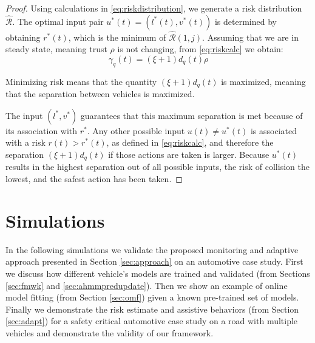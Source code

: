 \documentclass[letterpaper, 10 pt, conference]{ieeeconf}  %
\begin{document}
\begin{proof}
Using calculations in \eqref{eq:riskdistribution}, we generate a risk distribution $\hat{\mathcal{R}}$. The optimal input pair $u^*(t)=(l^*(t),v^*(t))$ is determined by obtaining $r^*(t)$, which is the minimum of $\hat{\mathcal{R}}(1,j)$. Assuming that we are in steady state, meaning trust $\rho$ is not changing, from \eqref{eq:riskcalc} we obtain:
\begin{equation}
\gamma_q(t) = (\xi+1) d_q(t) \rho
\end{equation}

Minimizing risk means that the quantity $(\xi+1)d_q(t)$ is maximized, meaning that the separation between vehicles is maximized.

The input $(l^*,v^*)$ guarantees that this maximum separation is met because of its association with $r^*$. Any other possible input $u(t) \neq u^*(t)$ is associated with a risk $r(t)>r^*(t)$, as defined in \eqref{eq:riskcalc}, and therefore the separation $(\xi+1)d_q(t)$ if those actions are taken is larger. Because $u^*(t)$ results in the highest separation out of all possible inputs, the risk of collision the lowest, and the safest action has been taken.

\end{proof}

\section{Simulations} \label{sec:sims}
In the following simulations we validate the proposed monitoring and adaptive approach presented in Section \ref{sec:approach} on an automotive case study. First we discuss how different vehicle's models are trained and validated (from Sections \ref{sec:fmwk} and \ref{sec:ahmmpredupdate}). Then we show an example of online model fitting (from Section \ref{sec:omf}) given a known pre-trained set of models. Finally we demonstrate the risk estimate and assistive behaviors (from Section \ref{sec:adapt}) for a safety critical automotive case study on a road with multiple vehicles and demonstrate the validity of our framework.
\end{document}
